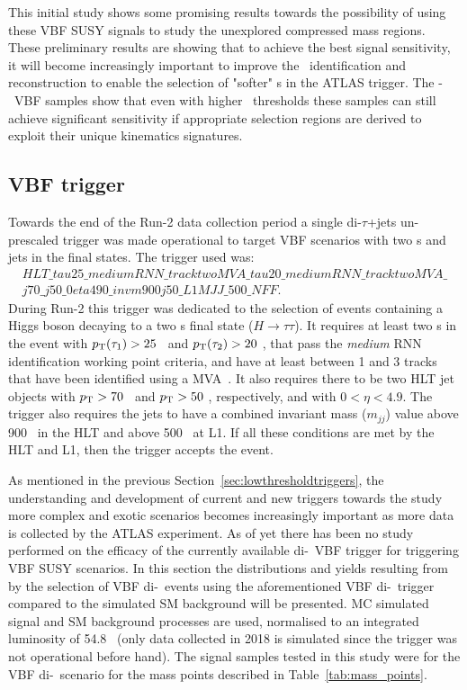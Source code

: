	This initial study shows some promising results towards the possibility of using these \ac{VBF} \ac{SUSY} signals to study the unexplored compressed mass regions. These preliminary results are showing that to achieve the best signal sensitivity, it will become increasingly important to improve the \htau\ identification and reconstruction to enable the selection of "softer" \ltau s in the \ac{ATLAS} trigger. 
	The \chinoonepm-\ninotwo\ \ac{VBF} samples show that even with higher \pt\ thresholds these samples can still achieve significant sensitivity if appropriate selection regions are derived to exploit their unique kinematics signatures. 
	 
	\subsection{VBF trigger}
	\label{subsec:vbf_trig}
	Towards the end of the Run-2 data collection period a single di-$\tau$+jets un-prescaled trigger was made operational to target \ac{VBF} scenarios with two \ltau s and jets in the final states.
	The trigger used was:
	\begin{multline*}
	HLT\_tau25\_mediumRNN\_tracktwoMVA\_tau20\_mediumRNN\_tracktwoMVA\_\\
	j70\_j50\_0eta490\_invm900j50\_L1MJJ\_500\_NFF.
	\end{multline*}
	During Run-2 this trigger was dedicated to the selection of events containing a Higgs boson decaying to a two \htau s final state ($H\rightarrow\tau\tau$).
	It requires at least two \ltau s in the event with $p_{\mathrm{T}}(\tau_1) >25$ \gev\ and $p_{\mathrm{T}}(\tau_2) >20$ \gev, that pass the \textit{medium} \ac{RNN} identification working point criteria, and have at least between 1 and 3 tracks that have been identified using a \ac{MVA}~\cite{ATL-PHYS-PUB-2015-045,tauSubstructure2016}. 
	It also requires there to be two \ac{HLT} jet objects with $p_{\mathrm{T}}>70$ \gev\ and $p_{\mathrm{T}}>50$ \gev, respectively, and with $0<\eta<4.9$. 
	The trigger also requires the jets to have a combined invariant mass ($m_{jj}$) value above 900 \gev\ in the \ac{HLT} and above 500 \gev\ at \ac{L1}.
	If all these conditions are met by the \ac{HLT} and \ac{L1}, then the trigger accepts the event. 
	
	As mentioned in the previous Section~\ref{sec:lowthresholdtriggers}, the understanding and development of current and new triggers towards the study more complex and exotic scenarios becomes increasingly important as more data is collected by the \ac{ATLAS} experiment.
	 As of yet there has been no study performed on the efficacy of the currently available di-\htau\ \ac{VBF} trigger for triggering \ac{VBF} \ac{SUSY} scenarios.
	 In this section the distributions and yields resulting from by the selection of \ac{VBF} di-\stau\ events using the aforementioned \ac{VBF} di-\htau\ trigger compared to the simulated \ac{SM} background will be presented. 
	 \ac{MC} simulated signal and \ac{SM} background processes are used, normalised to an integrated luminosity of 54.8 \infb\ (only data collected in 2018 is simulated since the trigger was not operational before hand). 
		The signal samples tested in this study were for the \ac{VBF} di-\stau\ scenario for the mass points described in Table~\ref{tab:mass_points}.
		
